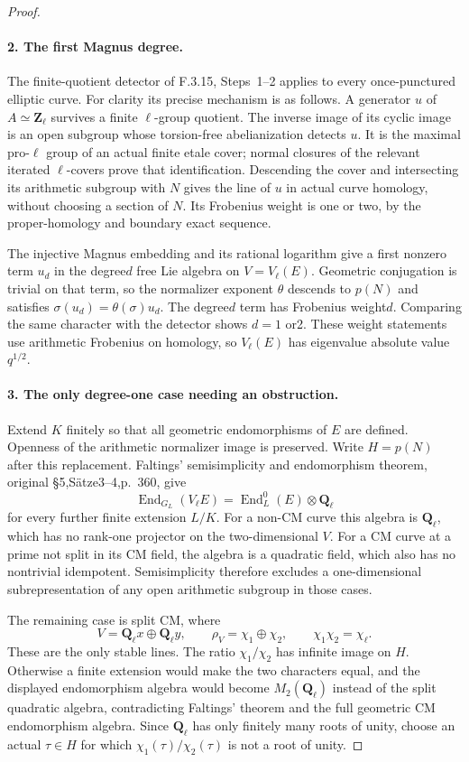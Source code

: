 \begin{proof}
\paragraph{2. The first Magnus degree.}
The finite-quotient detector of F.3.15, Steps~1--2 applies to every
once-punctured elliptic curve. For clarity its precise mechanism is
as follows. A generator $u$ of $A\simeq\mathbf Z_\ell$ survives a
finite $\ell$-group quotient. The inverse image of its cyclic image
is an open subgroup whose torsion-free abelianization detects $u$.
It is the maximal pro-$\ell$ group of an actual finite etale cover;
normal closures of the relevant iterated $\ell$-covers prove that
identification. Descending the cover and intersecting its arithmetic
subgroup with $N$ gives the line of $u$ in actual curve homology,
without choosing a section of $N$. Its Frobenius weight is one or
two, by the proper-homology and boundary exact sequence.

The injective Magnus embedding and its rational logarithm give a
first nonzero term $u_d$ in the degree$d$ free Lie algebra on
$V=V_\ell(E)$. Geometric conjugation is trivial on that term, so the
normalizer exponent $\theta$ descends to $p(N)$ and satisfies
$\sigma(u_d)=\theta(\sigma)u_d$. The degree$d$ term has Frobenius
weight$d$. Comparing the same character with the detector shows
$d=1$ or2. These weight statements use arithmetic Frobenius on
homology, so $V_\ell(E)$ has eigenvalue absolute value$q^{1/2}$.

\paragraph{3. The only degree-one case needing an obstruction.}
Extend $K$ finitely so that all geometric endomorphisms of $E$ are
defined. Openness of the arithmetic normalizer image is preserved.
Write $H=p(N)$ after this replacement. Faltings' semisimplicity and
endomorphism theorem, original \S5,S\"atze3--4,p.~360, give\cite{GenFaltings1983}
\[
 \operatorname{End}_{G_L}(V_\ell E)
 =\operatorname{End}^0_L(E)\otimes\mathbf Q_\ell
\]
for every further finite extension $L/K$.
For a non-CM curve this algebra is $\mathbf Q_\ell$, which has no
rank-one projector on the two-dimensional $V$. For a CM curve at a
prime not split in its CM field, the algebra is a quadratic field,
which also has no nontrivial idempotent. Semisimplicity therefore
excludes a one-dimensional subrepresentation of any open arithmetic
subgroup in those cases.

The remaining case is split CM, where
\[
 V=\mathbf Q_\ell x\oplus\mathbf Q_\ell y,
 \qquad \rho_V=\chi_1\oplus\chi_2,
 \qquad \chi_1\chi_2=\chi_\ell.
\]
These are the only stable lines. The ratio $\chi_1/\chi_2$ has
infinite image on $H$. Otherwise a finite extension would make the
two characters equal, and the displayed endomorphism algebra would
become $M_2(\mathbf Q_\ell)$ instead of the split quadratic algebra,
contradicting Faltings' theorem and the full geometric CM
endomorphism algebra. Since $\mathbf Q_\ell$ has only finitely many
roots of unity, choose an actual $\tau\in H$ for which
$\chi_1(\tau)/\chi_2(\tau)$ is not a root of unity.


\end{proof}
